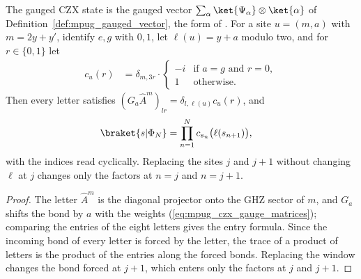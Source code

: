 \begin{lemma}
    \label{thm:mpug_czx_gauged_state_product}
    \leanok
    The gauged CZX state is the gauged vector
    $\sum_\alpha\ket{\Psi_\alpha}\otimes\ket{\alpha}$ of
    Definition~\ref{def:mpug_gauged_vector}, the form of
    \cite[lines~3511--3530]{FrancoRubio2025MPUGauging}. For a site $u=(m,a)$
    with $m=2y+y'$, identify $e,g$ with $0,1$, let $\ell(u)=y+a$ modulo two,
    and for $r\in\{0,1\}$ let
    \begin{align}
        c_u(r) & =\delta_{m,3r}\cdot
        \begin{cases}
            -i & \text{if } a=g \text{ and } r=0, \\
            1  & \text{otherwise}.
        \end{cases}
    \end{align}
    Then every letter satisfies
    $(G_a\widehat A^m)_{lr}=\delta_{l,\ell(u)}c_u(r)$, and
    \begin{align}
        \braket{s|\Phi_N}
         & =\prod_{n=1}^Nc_{s_n}\bigl(\ell(s_{n+1})\bigr),
        \label{eq:mpug_czx_gauged_product}
    \end{align}
    with the indices read cyclically. Replacing the sites $j$ and $j+1$
    without changing $\ell$ at $j$ changes only the factors at $n=j$ and
    $n=j+1$.
\end{lemma}

\begin{proof}\leanok
    The letter $\widehat A^m$ is the diagonal projector onto the GHZ sector of
    $m$, and $G_a$ shifts the bond by $a$ with the weights
    (\ref{eq:mpug_czx_gauge_matrices}); comparing the entries of the eight
    letters gives the entry formula. Since the incoming bond of every letter is forced by the
    letter, the trace of a product of letters is the product of the entries
    along the forced bonds. Replacing the window changes the bond forced at
    $j+1$, which enters only the factors at $j$ and $j+1$.
\end{proof}

